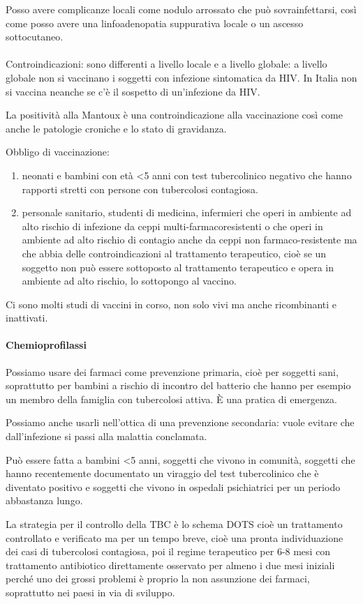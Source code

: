 Posso avere complicanze locali come nodulo arrossato che può
sovrainfettarsi, così come posso avere una linfoadenopatia suppurativa
locale o un ascesso sottocutaneo.
\\\\
Controindicazioni: sono differenti a livello locale e a livello globale:
a livello globale non si vaccinano i soggetti con infezione sintomatica
da HIV. In Italia non si vaccina neanche se c'è il sospetto di
un'infezione da HIV.

La positività alla Mantoux è una controindicazione alla vaccinazione
così come anche le patologie croniche e lo stato di gravidanza.

Obbligo di vaccinazione:
\begin{enumerate}

\item neonati e bambini con età \textless{}5 anni con test tubercolinico
negativo che hanno rapporti stretti con persone con tubercolosi
contagiosa.

\item  personale sanitario, studenti di medicina, infermieri che operi in
ambiente ad alto rischio di infezione da ceppi multi-farmacoresistenti o
che operi in ambiente ad alto rischio di contagio anche da ceppi non
farmaco-resistente ma che abbia delle controindicazioni al trattamento
terapeutico, cioè se un soggetto non può essere sottoposto al
trattamento terapeutico e opera in ambiente ad alto rischio, lo
sottopongo al vaccino.
\end{enumerate}
Ci sono molti studi di vaccini in corso, non solo vivi ma anche
ricombinanti e inattivati.

\paragraph{Chemioprofilassi}


Possiamo usare dei farmaci come prevenzione primaria, cioè per soggetti
sani, soprattutto per bambini a rischio di incontro del batterio che
hanno per esempio un membro della famiglia con tubercolosi attiva. È una
pratica di emergenza.

Possiamo anche usarli nell'ottica di una prevenzione secondaria: vuole
evitare che dall'infezione si passi alla malattia conclamata.

Può essere fatta a bambini \textless{}5 anni, soggetti che vivono in
comunità, soggetti che hanno recentemente documentato un viraggio del
test tubercolinico che è diventato positivo e soggetti che vivono in
ospedali psichiatrici per un periodo abbastanza lungo.

La strategia per il controllo della TBC è lo schema DOTS cioè un
trattamento controllato e verificato ma per un tempo breve, cioè una
pronta individuazione dei casi di tubercolosi contagiosa, poi il regime
terapeutico per 6-8 mesi con trattamento antibiotico direttamente
osservato per almeno i due mesi iniziali perché uno dei grossi problemi
è proprio la non assunzione dei farmaci, soprattutto nei paesi in via di
sviluppo.
